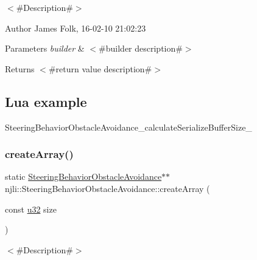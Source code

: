 $<$\#\+Description\#$>$ 

\begin{DoxyAuthor}{Author}
James Folk, 16-\/02-\/10 21\+:02\+:23
\end{DoxyAuthor}

\begin{DoxyParams}{Parameters}
{\em builder} & $<$\#builder description\#$>$\\
\hline
\end{DoxyParams}
\begin{DoxyReturn}{Returns}
$<$\#return value description\#$>$
\end{DoxyReturn}
\hypertarget{classnjli_1_1_steering_behavior_wander_ex1}{}\subsection{Lua example}\label{classnjli_1_1_steering_behavior_wander_ex1}

\begin{DoxyCodeInclude}
\end{DoxyCodeInclude}
Steering\+Behavior\+Obstacle\+Avoidance\+\_\+calculate\+Serialize\+Buffer\+Size\+\_\+ \mbox{\label{classnjli_1_1_steering_behavior_obstacle_avoidance_a8ea948f8b9b36f9cc9842595bf5a1913}} 
\subsubsection{\texorpdfstring{create\+Array()}{createArray()}}
{\footnotesize\ttfamily static \mbox{\hyperlink{classnjli_1_1_steering_behavior_obstacle_avoidance}{Steering\+Behavior\+Obstacle\+Avoidance}}$\ast$$\ast$ njli\+::\+Steering\+Behavior\+Obstacle\+Avoidance\+::create\+Array (\begin{DoxyParamCaption}\item[{const \mbox{\hyperlink{_util_8h_a10e94b422ef0c20dcdec20d31a1f5049}{u32}}}]{size }\end{DoxyParamCaption})\hspace{0.3cm}{\ttfamily [static]}}



$<$\#\+Description\#$>$ 

